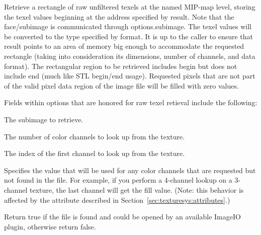 Retrieve a rectangle of raw unfiltered texels at the named MIP-map level, storing
the texel values beginning at the address specified by result.
Note that the face/subimage is communicated through {\kw options.subimage}.
The texel values will be converted to the type specified by
format.  It is up to the caller to ensure that result points to
an area of memory big enough to accommodate the requested
rectangle (taking into consideration its dimensions, number of
channels, and data format).  The rectangular region to be
retrieved includes {\cf begin} but does not include {\cf end} (much
like STL begin/end usage).
Requested pixels that are not part of the valid pixel data region of the
image file will be filled with zero values.

Fields within {\cf options} that are honored for raw texel retieval
include the following:

\vspace{-12pt}
\vspace{10pt}
The subimage to retrieve.
\apiend

\vspace{-24pt}
\vspace{10pt}
The number of color channels to look up from the texture.
\apiend

\vspace{-24pt}
\vspace{10pt}
The index of the first channel to look up from the texture.
\apiend


\vspace{-24pt}
\vspace{10pt}
Specifies the value that will be used for any color channels that are
requested but not found in the file.  For example, if you perform a
4-channel lookup on a 3-channel texture, the last channel will
get the fill value.  (Note: this behavior is affected by the
 attribute described in 
Section~\ref{sec:texturesys:attributes}.)
\apiend

Return true if the file is found and could be opened by an
available ImageIO plugin, otherwise return false.

